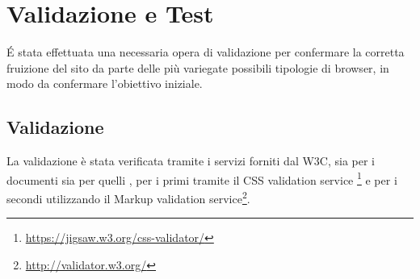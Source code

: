 \documentclass{tecweb}
\begin{document}
	\newpage
	\section{Validazione e Test}
	\'E stata effettuata una necessaria opera di validazione per confermare la corretta fruizione del sito da parte delle più variegate possibili tipologie di browser, in modo da confermare l'obiettivo iniziale.
	\subsection{Validazione}
	La validazione è stata verificata tramite i servizi forniti dal W3C, sia per i documenti  sia per quelli , per i primi tramite
	 il CSS validation service \footnote{\url{https://jigsaw.w3.org/css-validator/}} e per i secondi utilizzando il Markup validation service\footnote{\url{http://validator.w3.org/}}.
\end{document}
